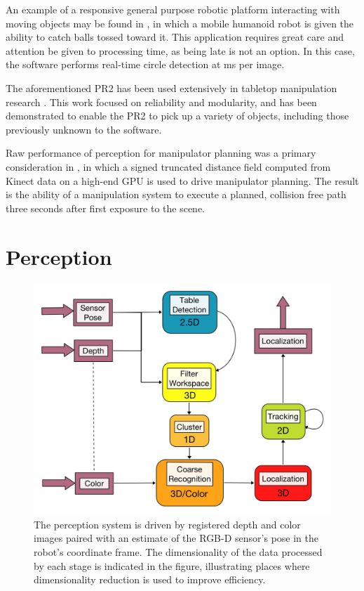 \documentclass[letterpaper, 10 pt, conference]{ieeeconf}  %
\begin{document}
An example of a responsive general purpose robotic platform
interacting with moving objects may be found in
\cite{Birbach2011:Catch}, in which a mobile humanoid robot is given
the ability to catch balls tossed toward it. This application requires
great care and attention be given to processing time, as being late is
not an option. In this case, the software performs real-time circle
detection at \unit[35]{ms} per image.

The aforementioned PR2 has been used extensively in tabletop
manipulation research \cite{WGObjectManipulation}. This work focused
on reliability and modularity, and has been demonstrated to enable the
PR2 to pick up a variety of objects, including those previously
unknown to the software.

Raw performance of perception for manipulator planning was a primary
consideration in \cite{Wagner2013:GPUMotionPlanning}, in which a
signed truncated distance field computed from Kinect data on a
high-end GPU is used to drive manipulator planning. The result is the
ability of a manipulation system to execute a planned, collision free
path three seconds after first exposure to the scene.

\section{Perception}
\begin{figure}[t]
\centering
\includegraphics[width=0.9\columnwidth]{figures/perception-pipeline.jpg}
\caption{ The perception system is driven by registered depth and
  color images paired with an estimate of the RGB-D sensor's pose in
  the robot's coordinate frame. The dimensionality of the data
  processed by each stage is indicated in the figure, illustrating
  places where dimensionality reduction is used to improve efficiency.
}
\label{fig:perception-pipeline}
\end{figure}
\end{document}
